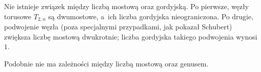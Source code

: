 Nie istnieje związek między liczbą mostową oraz gordyjską.
Po pierwsze, węzły torusowe $T_{2,n}$ są dwumostowe, a~ich liczba gordyjska nieograniczona.
Po drugie, podwojenie węzła (poza specjalnymi przypadkami, jak pokazał Schubert) zwiększa liczbę mostową dwukrotnie; liczba gordyjska takiego podwojenia wynosi $1$.

Podobnie nie ma zależności między liczbą mostową oraz genusem.

